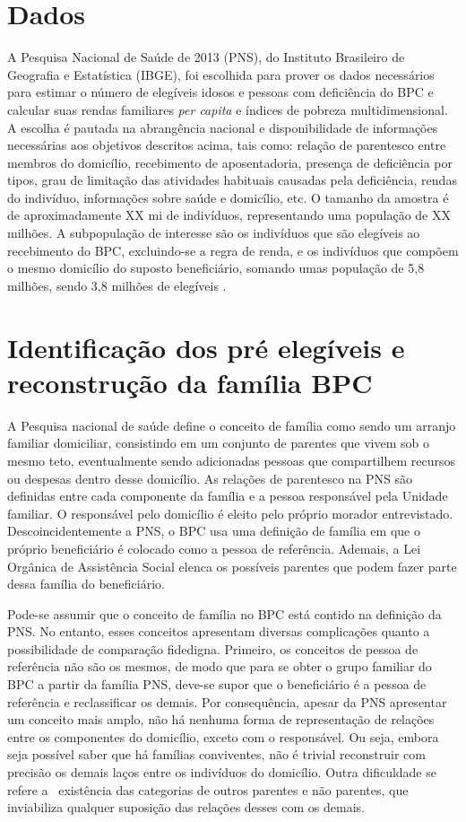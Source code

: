 \documentclass[
	12pt,				%
	openright,			%
	twoside,			%
	a4paper,			%
	english,			%
	french,				%
	spanish,			%
	brazil				%
	]{abntex2}
\begin{document}
	\section{Dados}
	A Pesquisa Nacional de Saúde de 2013 (PNS), do Instituto Brasileiro de Geografia e Estatística (IBGE), foi escolhida para prover os dados necessários para estimar o número de elegíveis idosos e pessoas com deficiência do BPC e calcular suas rendas familiares \textit{per capita} e índices de pobreza multidimensional. A escolha é pautada na abrangência nacional e disponibilidade de informações necessárias aos objetivos descritos acima, tais como: relação de parentesco entre membros do domicílio, recebimento de aposentadoria, presença de deficiência por tipos, grau de limitação das atividades habituais causadas pela deficiência, rendas do indivíduo, informações sobre saúde e domicílio, etc.   
	O tamanho da amostra é de aproximadamente XX mi de indivíduos, representando uma população de XX milhões. A subpopulação de interesse são os indivíduos que são elegíveis ao recebimento do BPC, excluindo-se a regra de renda, e os indivíduos que compõem o mesmo domicílio do suposto beneficiário, somando umas população de 5,8 milhões, sendo 3,8 milhões de elegíveis .
	
	\section{Identificação dos pré elegíveis e reconstrução da família BPC}
	
	A Pesquisa nacional de saúde define o conceito de família como sendo um arranjo familiar domiciliar, consistindo em um conjunto de parentes que vivem sob o mesmo teto, eventualmente sendo adicionadas pessoas que compartilhem recursos ou despesas dentro desse domicílio. As relações de parentesco na PNS são definidas entre cada componente da família e a pessoa responsável pela Unidade familiar. O responsável pelo domicílio é eleito pelo próprio morador entrevistado. Descoincidentemente a PNS, o BPC usa uma definição de família em que o próprio beneficiário é colocado como a pessoa de referência. Ademais, a Lei Orgânica de Assistência Social elenca os possíveis parentes que podem fazer parte dessa família do beneficiário.
	
	Pode-se assumir que o conceito de família no BPC está contido na definição da PNS. No entanto, esses conceitos apresentam diversas complicações quanto a  possibilidade de comparação fidedigna. Primeiro, os conceitos de pessoa de referência não são os mesmos, de modo que para se obter o grupo familiar do BPC a partir da família PNS, deve-se supor que o beneficiário é a pessoa de referência e reclassificar os demais. Por consequência, apesar da PNS apresentar um conceito mais amplo, não há nenhuma forma de representação de relações entre os componentes do domicílio, exceto com o responsável. Ou seja, embora seja possível saber que há famílias conviventes, não é trivial reconstruir com precisão os demais laços entre os indivíduos do domicílio. Outra dificuldade se refere a  existência das categorias de outros parentes e não parentes, que inviabiliza qualquer suposição das relações desses com os demais. 
	
\end{document}
